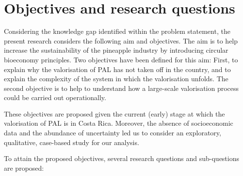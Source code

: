 \section{Objectives and research questions}
\label{researchQ}

Considering the knowledge gap identified within the problem statement, the present research considers the following aim and objectives. The aim is to help increase the sustainability of the pineapple industry by introducing circular bioeconomy principles. Two objectives have been defined for this aim: First, to explain why the valorisation of PAL has not taken off in the country, and to explain the complexity of the system in which the valorisation unfolds. The second objective is to help to understand how a large-scale valorisation process could be carried out operationally. 

These objectives are proposed given the current (early) stage at which the valorisation of PAL is in Costa Rica. Moreover, the absence of socioeconomic data and the abundance of uncertainty led us to consider an exploratory, qualitative, case-based study for our analysis.

To attain the proposed objectives, several research questions and sub-questions are proposed:

